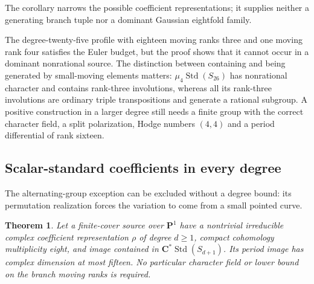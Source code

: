 \documentclass[11pt]{article}
\newtheorem{theorem}{Theorem}[section]
\theoremstyle{definition}
\theoremstyle{remark}
\newcommand{\C}{\mathbf C}
\begin{document}
The corollary narrows the possible coefficient representations;
it supplies neither a generating branch tuple nor a dominant
Gaussian eightfold family.


The degree-twenty-five profile with eighteen moving ranks three and
one moving rank four satisfies the Euler budget, but the proof shows
that it cannot occur in a dominant nonrational source. The distinction
between containing and being generated by small-moving elements matters:
$\mu_4\operatorname{Std}(S_{26})$ has nonrational character and contains
rank-three involutions, whereas all its rank-three involutions are
ordinary triple transpositions and generate a rational subgroup. A
positive construction in a larger degree still needs a finite group
with the correct character field, a split polarization, Hodge numbers
$(4,4)$ and a period differential of rank sixteen.



\subsection{Scalar-standard coefficients in every degree}

The alternating-group exception can be excluded without a degree
bound: its permutation realization forces the variation to come
from a small pointed curve.

\begin{theorem}\label{thm:scalar-standard-all-ranks}
Let a finite-cover source over $\mathbf P^1$ have a nontrivial
irreducible complex coefficient representation $\rho$ of degree
$d\ge1$, compact cohomology multiplicity eight, and image contained
in $\C^*\operatorname{Std}(S_{d+1})$.
Its period image has complex dimension at most fifteen.
No particular character field or lower bound on the branch moving
ranks is required.
\end{theorem}
\end{document}
